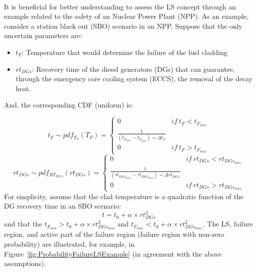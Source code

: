 \\It is beneficial for better understanding to assess the LS concept through an example related to the safety of an Nuclear Power Plant (NPP).
As an example, consider a station black out (SBO) scenario in an NPP. Suppose that the only uncertain parameters are:
\begin{itemize}
  \item $t_{F}$: Temperature that would determine the failure of the fuel cladding
  \item $rt_{DGs}$: Recovery time of the diesel generators (DGs) that
  can guarantee, through the emergency core cooling system (ECCS),
  the removal of the decay heat.
\end{itemize}
And, the corresponding CDF (uniform) is:

\begin{equation}
t_{F}\sim pdf_{T_{F}}\left ( T_{F} \right )=\left\{\begin{matrix}
0 & if \: t_{F}< t_{F_{min}} \\
\frac{1}{\left ( t_{F_{max}}- t_{F_{min}} \right )=\Delta t_{F}} & \\
0 & if \: t_{F}>  t_{F_{max}}
\end{matrix}\right.
\end{equation}
%
%
\begin{equation}
rt_{DGs}\sim pdf_{RT_{DGs}}\left ( rt_{DGs} \right )=\left\{\begin{matrix}
0 & if \: rt_{DGs}<rt_{DGs_{min}}   \\
\frac{1}{\left ( rt_{DGs_{max}} - rt_{DGs_{min}} \right )=\Delta rt_{DGs}} & \\
0 & if \: rt_{DGs}>rt_{DGs_{max}}
\end{matrix}\right.
\end{equation}
For simplicity, assume that the clad temperature is a quadratic function of the DG recovery time in an SBO scenario:
\begin{equation}
  t = t_{0}+\alpha \times rt_{DGs}^{2}
\end{equation}
and that the  $ t_{F_{min}} > t_{0}+\alpha \times rt_{DGs_{min}}^{2}$
and $t_{F_{max}} < t_{0}+\alpha \times rt_{DGs_{max}}^{2}$.
The LS, failure region, and active part of the failure region (failure region with non-zero probability) are illustrated, for example, in Figure~\ref{fig:ProbabilityFailureLSExample} (in agreement with the above assumptions).
